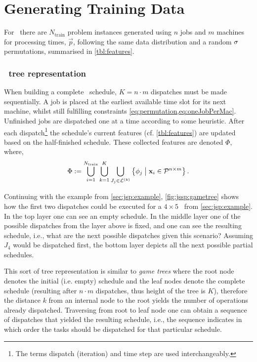 
\chapter{Generating Training Data}\label{ch:gentrdat} 

For \jsp\ there are $N_{\text{train}}$ problem instances generated using $n$ 
jobs and $m$ machines for processing times, $\vec{p}$, following the same data 
distribution and a random ${\mathbf{\sigma}}$ permutations, summarised in 
\cref{tbl:features}.  

\subsection{\Jsp\ tree representation}\label{sec:gen:gametree}
When building a complete \jsp\ schedule, $K=n\cdot m$ dispatches must be 
made sequentially.
A job is placed at the earliest available time slot for its next machine, 
whilst still fulfilling constraints \cref{eq:permutation,eq:oneJobPerMac}.
Unfinished jobs are dispatched one at a time according to some heuristic. 
After each dispatch\footnote{The terms dispatch (iteration) and time step are 
used interchangeably.} the schedule's current features (cf. 
\cref{tbl:features}) are updated based on the half-finished schedule. 
These collected features are denoted $\Phi$, where, 
\begin{eqnarray}\label{eq:Phi}
\Phi:= \bigcup_{i=1}^{N_{\text{train}}} 
\bigcup_{k=1}^K\bigcup_{J_j\in\mathcal{L}^{(k)}} 
\condset{\vphi_j}{\vec{x}_i\in\mathcal{P}^{n\times m} }.
\end{eqnarray}

Continuing with the example from \cref{sec:jsp:example}, 
\cref{fig:jssp:gametree} shows how the first two dispatches could be executed 
for a $4\times5$ \jsp\ from \cref{sec:jsp:example}.
In the top layer one can see an empty schedule.
In the middle layer one of the possible dispatches from the layer above is 
fixed, and one can see the resulting schedule, i.e., what are the next possible 
dispatches given this scenario? Assuming $J_4$ would be dispatched first, the 
bottom layer depicts all the next possible partial schedules.

This sort of tree representation is similar to \emph{game trees} 
\citep[cf.][]{Rosen03} where the root node denotes the initial (i.e. empty) 
schedule and the leaf nodes denote the complete schedule (resulting after 
$n\cdot m$ dispatches, thus height of the tree is $K$), therefore the 
distance $k$ from an internal node to the root yields the number of operations 
already dispatched. Traversing from root to leaf node one can obtain a sequence 
of dispatches that yielded the resulting schedule, i.e., the sequence indicates 
in which order the tasks should be dispatched for that particular schedule. 

